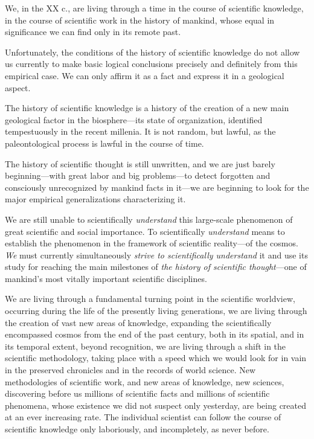 We, in the XX c., are living through a time in the course of scientific
knowledge, in the course of scientific work in the history of mankind, whose
equal in significance we can find only in its remote past.

Unfortunately, the conditions of the history of scientific knowledge do not
allow us currently to make basic logical conclusions precisely and definitely
from this empirical case.  We can only affirm it as a fact and express it in a
geological aspect.

The history of scientific knowledge is a history of the creation of a new main
geological factor in the biosphere---its state of
organization,
identified tempestuously in the recent millenia.  It is not random, but lawful,
as the paleontological process is lawful in the course of time.

The history of scientific thought is still unwritten, and we are just barely
beginning---with great labor and big problems---to detect forgotten and
consciously unrecognized by mankind facts in it---we are beginning to look for
the major empirical generalizations characterizing it.

We are still unable to scientifically \emph{understand} this large-scale
phenomenon of great scientific and social importance.  To scientifically
\emph{understand} means to establish the phenomenon in the framework of
scientific reality---of the cosmos.  \emph{We} must currently simultaneously
\emph{strive to scientifically understand} it and use its study for
reaching the main milestones of \emph{the history of scientific thought}---one
of mankind's most vitally important scientific disciplines.

We are living through a fundamental turning point in the scientific worldview,
occurring during the life of the presently living generations, we are living
through the creation of vast new areas of knowledge, expanding the
scientifically encompassed cosmos from the end of the past century, both in its
spatial, and in its temporal extent, beyond recognition, we are living through
a shift in the scientific methodology, taking place with a speed which we would
look for in vain in the preserved chronicles and in the records of world
science.  New methodologies of scientific work, and new areas of knowledge, new
sciences, discovering before us millions of scientific facts and millions of
scientific phenomena, whose existence we did not suspect only yesterday, are
being created at an ever increasing rate.  The individual scientist can follow
the course of scientific knowledge only laboriously, and incompletely, as never
before.

